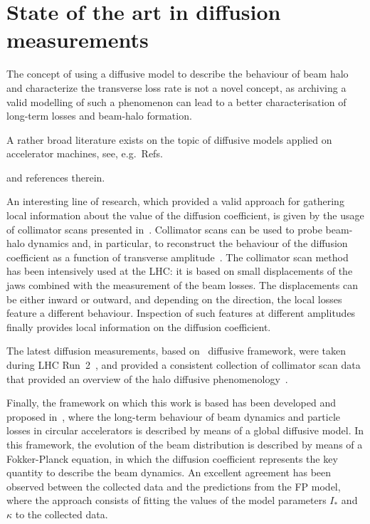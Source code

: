 \section{State of the art in diffusion measurements}

The concept of using a diffusive model to describe the behaviour of beam halo and characterize the transverse loss rate is not a novel concept, as archiving a valid modelling of such a phenomenon can lead to a better characterisation of long-term losses and beam-halo formation.

A rather broad literature exists on the topic of diffusive models applied on accelerator machines, see, e.g.\ Refs.~{\cite{Burnod:205343,Meddahi:223301,PhysRevLett.68.33,gerasimov1992applicability,zimmermann1994transverse,PhysRevLett.77.1051,PhysRevSTAB.5.074001,flilleriii:pac03-rpag004} and references therein. %

An interesting line of research, which provided a valid approach for gathering local information about the value of the diffusion coefficient, is given by the usage of collimator scans presented in~\cite{MESS1994279}. Collimator scans can be used to probe beam-halo dynamics and, in particular, to reconstruct the behaviour of the diffusion coefficient as a function of transverse amplitude~\cite{stancari2011diffusion,PhysRevSTAB.16.021003,PhysRevAccelBeams.23.044802}. The collimator scan method has been intensively used at the LHC: it is based on small displacements of the jaws combined with the measurement of the beam losses. The displacements can be either inward or outward, and depending on the direction, the local losses feature a different behaviour. Inspection of such features at different amplitudes finally provides local information on the diffusion coefficient.

The latest diffusion measurements, based on~\cite{stancari2011diffusion} diffusive framework, were taken during LHC Run~2~\cite{Valentino:2280928}, and provided a consistent collection of collimator scan data that provided an overview of the halo diffusive phenomenology~\cite{PhysRevAccelBeams.23.044802}.  

Finally, the framework on which this work is based has been developed and proposed in~\cite{Bazzani:2019lse,bazzani2020diffusion}, where the long-term behaviour of beam dynamics and particle losses in circular accelerators is described by means of a global diffusive model. In this framework, the evolution of the beam distribution is described by means of a Fokker-Planck equation, in which the diffusion coefficient represents the key quantity to describe the beam dynamics. An excellent agreement has been observed between the collected data and the predictions from the FP model, where the approach consists of fitting the values of the model parameters $I_\ast$ and $\kappa$ to the collected data.


}
